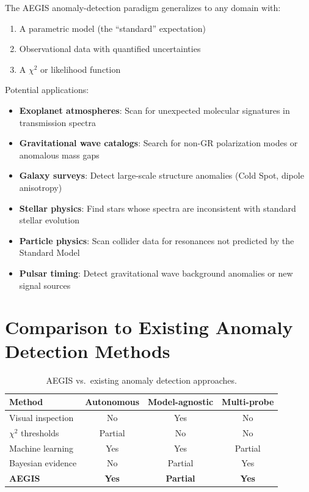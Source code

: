 \documentclass[twocolumn,showpacs,preprintnumbers,amsmath,amssymb,prl]{revtex4-2}
\begin{document}
The AEGIS anomaly-detection paradigm generalizes to any domain with:
\begin{enumerate}
\item A parametric model (the ``standard'' expectation)
\item Observational data with quantified uncertainties
\item A $\chi^2$ or likelihood function
\end{enumerate}

Potential applications:
\begin{itemize}
\item \textbf{Exoplanet atmospheres}: Scan for unexpected molecular signatures in transmission spectra
\item \textbf{Gravitational wave catalogs}: Search for non-GR polarization modes or anomalous mass gaps
\item \textbf{Galaxy surveys}: Detect large-scale structure anomalies (Cold Spot, dipole anisotropy)
\item \textbf{Stellar physics}: Find stars whose spectra are inconsistent with standard stellar evolution
\item \textbf{Particle physics}: Scan collider data for resonances not predicted by the Standard Model
\item \textbf{Pulsar timing}: Detect gravitational wave background anomalies or new signal sources
\end{itemize}

\section{Comparison to Existing Anomaly Detection Methods}

\begin{table}[h]
\caption{AEGIS vs.\ existing anomaly detection approaches.}
\begin{ruledtabular}
\begin{tabular}{lccc}
Method & Autonomous & Model-agnostic & Multi-probe \\
\hline
Visual inspection & No & Yes & No \\
$\chi^2$ thresholds & Partial & No & No \\
Machine learning & Yes & Yes & Partial \\
Bayesian evidence & No & Partial & Yes \\
\textbf{AEGIS} & \textbf{Yes} & \textbf{Partial} & \textbf{Yes} \\
\end{tabular}
\end{ruledtabular}
\end{table}
\end{document}

